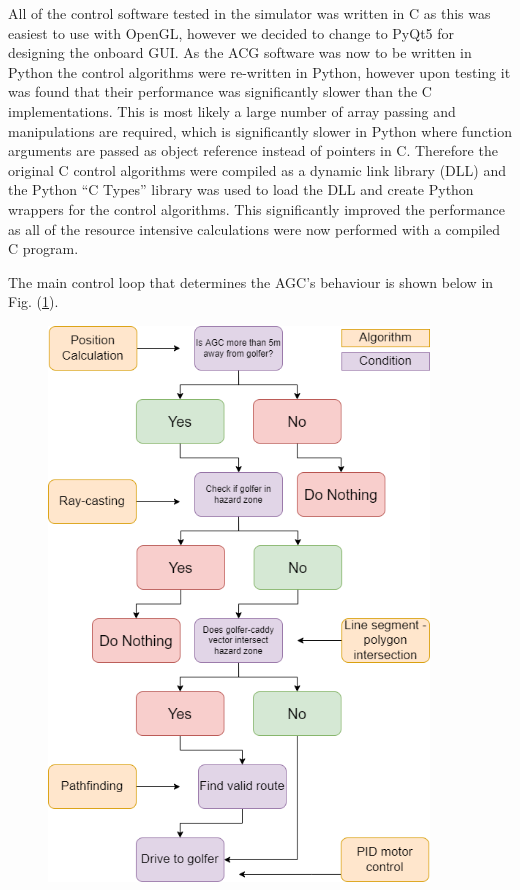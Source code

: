 \documentclass[11pt,landscape]{article}
\begin{document}
\begin{multicols}{3}
All of the control software tested in the simulator was written in C as this was
easiest to use with OpenGL, however we decided to change to PyQt5 for designing
the onboard GUI. As the ACG software was now to be written in Python the control
algorithms were re-written in Python, however upon testing it was found that
their performance was significantly slower than the C implementations. This is
most likely a large number of array passing and manipulations are required,
which is significantly slower in Python where function arguments are passed as
object reference instead of pointers in C. Therefore the original C control
algorithms were compiled as a dynamic link library (DLL) and the Python ``C
Types'' library was used to load the DLL and create Python wrappers for the control
algorithms. This significantly improved the performance as all of the resource
intensive calculations were now performed with a compiled C program.

The main control loop that determines the AGC's behaviour is shown below in
Fig. (\ref{fig:control_loop}).
\begin{figure}[H]
\begin{mdframed}
    \begin{center}
        \includegraphics[width=0.9\textwidth]{control_loop.png}
    \end{center}
\end{mdframed}
\label{fig:control_loop}
\end{figure}

\end{multicols}
\end{document}
